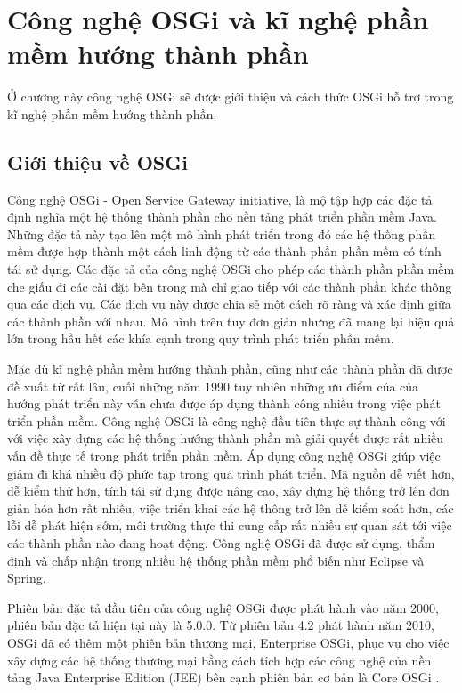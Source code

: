 \chapter{Công nghệ OSGi và kĩ nghệ phần mềm hướng thành phần}
Ở chương này công nghệ OSGi sẽ được giới thiệu và cách thức OSGi hỗ trợ trong kĩ nghệ phần mềm hướng thành phần.  

\section{Giới thiệu về OSGi}
Công nghệ OSGi - Open Service Gateway initiative, là mộ tập hợp các đặc tả định nghĩa một hệ thống thành phần cho nền tảng phát triển phần mềm Java. Những đặc tả này tạo lên một mô hình phát triển trong đó các hệ thống phần mềm được hợp thành một cách linh động từ các thành phần phần mềm có tính tái sử dụng. Các đặc tả của công nghệ OSGi cho phép các thành phần phần mềm che giấu đi các cài đặt bên trong mà chỉ giao tiếp với các thành phần khác thông qua các dịch vụ. Các dịch vụ này được chia sẻ một cách rõ ràng và xác định giữa các thành phần với nhau. Mô hình trên tuy đơn giản nhưng đã mang lại hiệu quả lớn trong hầu hết các khía cạnh trong quy trình phát triển phần mềm.

Mặc dù kĩ nghệ phần mềm hướng thành phần, cũng như các thành phần đã được đề xuất từ rất lâu, cuối những năm 1990 \cite{component-based-ian} tuy nhiên những ưu điểm của của hướng phát triển này vẫn chưa được áp dụng thành công nhiều trong việc phát triển phần mềm. Công nghệ OSGi là công nghệ đầu tiên thực sự thành công với với việc xây dựng các hệ thống hướng thành phần mà giải quyết được rất nhiều vấn đề thực tế trong phát triển phần mềm. Áp dụng công nghệ OSGi giúp việc giảm đi khá nhiều độ phức tạp trong quá trình phát triển. Mã nguồn dễ viết hơn, dễ kiểm thử hơn, tính tái sử dụng được nâng cao, xây dựng hệ thống trở lên đơn giản hóa hơn rất nhiều, việc triển khai các hệ thông trở lên dễ kiểm soát hơn, các lỗi dễ phát hiện sớm, môi trường thực thi cung cấp rất nhiều sự quan sát tới việc các thành phần nào đang hoạt động. Công nghệ OSGi đã được sử dụng, thẩm định và chấp nhận trong nhiều hệ thống phần mềm phổ biến như Eclipse và Spring.\cite{whatisosgi}

Phiên bản đặc tả đầu tiên của công nghệ OSGi được phát hành vào năm 2000, phiên bản đặc tả hiện tại này là 5.0.0. Từ phiên bản 4.2 phát hành năm 2010, OSGi đã có thêm một phiên bản thương mại, Enterprise OSGi, phục vụ cho việc xây dựng các hệ thống thương mại bằng cách tích hợp các công nghệ của nền tảng Java Enterprise Edition (JEE) bên cạnh phiên bản cơ bản là Core OSGi \cite{specs}.


